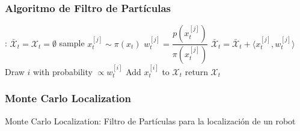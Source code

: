 \begin{frame}
    \frametitle{Algoritmo de Filtro de Partículas}

    \begin{algorithmic}[1]
    :
    \State $\bar{\mathcal{X}}_t = \mathcal{X}_t = \emptyset$
        \State sample $x_t^{[j]} \sim \pi(x_t)$
        \State $w_t^{[j]} = \dfrac{p(x_t^{[j]})}{\pi(x_{t}^{[j]})}$
        \State $\bar{\mathcal{X}}_t = \bar{\mathcal{X}}_t + \langle x_t^{[j]}, w_t^{[j]}\rangle$
    \EndFor
        \State Draw $i$ with probability $\propto w_t^{[i]}$
        \State Add $x_t^{[i]}$ to $\mathcal{X}_t$
    \EndFor
    \State return $\mathcal{X}_t$
    \EndProcedure
    \end{algorithmic}
\end{frame}


\begin{frame}
    \frametitle{Monte Carlo Localization}

    Monte Carlo Localization: Filtro de Partículas para la localización de un robot

\end{frame}





